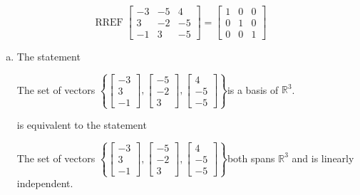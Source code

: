 \begin{exerciseAnswer} 


\[\operatorname{RREF} \left[\begin{array}{ccc}
-3 & -5 & 4 \\
3 & -2 & -5 \\
-1 & 3 & -5
\end{array}\right] = \left[\begin{array}{ccc}
1 & 0 & 0 \\
0 & 1 & 0 \\
0 & 0 & 1
\end{array}\right] \]


\begin{enumerate}[(a)]
\item The statement 
\begin{center}\begin{minipage}{0.8\textwidth}
 The set of vectors \( \left\{ \left[\begin{array}{c}
-3 \\
3 \\
-1
\end{array}\right] , \left[\begin{array}{c}
-5 \\
-2 \\
3
\end{array}\right] , \left[\begin{array}{c}
4 \\
-5 \\
-5
\end{array}\right] \right\} \)is a basis of \(\mathbb{R}^3\). 
\end{minipage}\end{center}
     is equivalent to the statement 
\begin{center}\begin{minipage}{0.8\textwidth}
 The set of vectors \( \left\{ \left[\begin{array}{c}
-3 \\
3 \\
-1
\end{array}\right] , \left[\begin{array}{c}
-5 \\
-2 \\
3
\end{array}\right] , \left[\begin{array}{c}
4 \\
-5 \\
-5
\end{array}\right] \right\} \)both spans \(\mathbb{R}^3\) and is linearly independent.
\end{minipage}\end{center}
    

\end{enumerate}
\end{exerciseAnswer}
